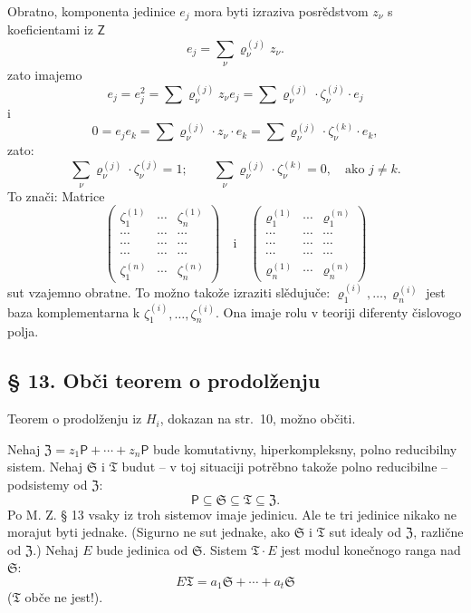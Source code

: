 \documentclass[11pt]{article}
\begin{document}
Obratno, komponenta jedinice \(e_j\) mora byti izraziva posrědstvom \(z_\nu\) s koeficientami iz \(\mathsf Z\)
\[
e_j=\sum_\nu \varrho_\nu^{(j)}z_\nu .
\]
zato imajemo
\[
e_j=e_j^2=\sum \varrho_\nu^{(j)}z_\nu e_j
=\sum \varrho_\nu^{(j)}\cdot\zeta_\nu^{(j)}\cdot e_j
\]
i
\[
0=e_je_k=\sum \varrho_\nu^{(j)}\cdot z_\nu\cdot e_k
=\sum \varrho_\nu^{(j)}\cdot\zeta_\nu^{(k)}\cdot e_k,
\]
zato:
\[
\sum_\nu \varrho_\nu^{(j)}\cdot\zeta_\nu^{(j)}=1;
\qquad
\sum_\nu \varrho_\nu^{(j)}\cdot\zeta_\nu^{(k)}=0,\quad
\text{ako } j\ne k.
\]
To znači: Matrice
\[
\begin{pmatrix}
\zeta_1^{(1)} & \cdots & \zeta_n^{(1)}\\
\cdots & \cdots & \cdots\\
\cdots & \cdots & \cdots\\
\cdots & \cdots & \cdots\\
\zeta_1^{(n)} & \cdots & \zeta_n^{(n)}
\end{pmatrix}
\quad\text{i}\quad
\begin{pmatrix}
\varrho_1^{(1)} & \cdots & \varrho_1^{(n)}\\
\cdots & \cdots & \cdots\\
\cdots & \cdots & \cdots\\
\cdots & \cdots & \cdots\\
\varrho_n^{(1)} & \cdots & \varrho_n^{(n)}
\end{pmatrix}
\]
sut vzajemno obratne. To možno takože izraziti slědujuče: \(\varrho_1^{(i)},\ldots,\varrho_n^{(i)}\) jest baza komplementarna k \(\zeta_1^{(i)},\ldots,\zeta_n^{(i)}\). Ona imaje rolu v teoriji diferenty čislovogo polja.

\subsection*{§ 13. Obči teorem o prodolženju}\label{der-allgemeine-fortsetzungssatz}

Teorem o prodolženju iz \(H_i\), dokazan na str.~10, možno občiti.

Nehaj \(\mathfrak Z=z_1\mathsf P+\cdots+z_n\mathsf P\) bude komutativny, hiperkompleksny, polno reducibilny sistem. Nehaj \(\mathfrak S\) i \(\mathfrak T\) budut -- v toj situaciji potrěbno takože polno reducibilne -- podsistemy od \(\mathfrak Z\):
\[
\mathsf P\subseteq\mathfrak S\subseteq\mathfrak T\subseteq\mathfrak Z .
\]
Po M. Z. § 13 vsaky iz troh sistemov imaje jedinicu. Ale te tri jedinice nikako ne morajut byti jednake. (Sigurno ne sut jednake, ako \(\mathfrak S\) i \(\mathfrak T\) sut idealy od \(\mathfrak Z\), različne od \(\mathfrak Z\).) Nehaj \(E\) bude jedinica od \(\mathfrak S\). Sistem \(\mathfrak T\cdot E\) jest modul konečnogo ranga nad \(\mathfrak S\):
\[
E\mathfrak T=a_1\mathfrak S+\cdots+a_t\mathfrak S
\]
(\(\mathfrak T\) obče ne jest!).
\end{document}
